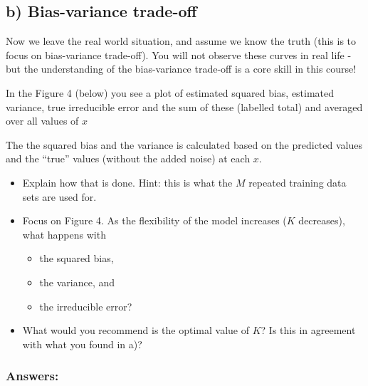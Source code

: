 \documentclass[]{article}
\providecommand{\tightlist}{%
  \setlength{\itemsep}{0pt}\setlength{\parskip}{0pt}}
\begin{document}
\subsection{b) Bias-variance trade-off}\label{b-bias-variance-trade-off}

Now we leave the real world situation, and assume we know the truth
(this is to focus on bias-variance trade-off). You will not observe
these curves in real life - but the understanding of the bias-variance
trade-off is a core skill in this course!

In the Figure 4 (below) you see a plot of estimated squared bias,
estimated variance, true irreducible error and the sum of these
(labelled total) and averaged over all values of \(x\)

The the squared bias and the variance is calculated based on the
predicted values and the ``true'' values (without the added noise) at
each \(x\).

\begin{itemize}
\tightlist
\item
  Explain how that is done. Hint: this is what the \(M\) repeated
  training data sets are used for.
\item
  Focus on Figure 4. As the flexibility of the model increases (\(K\)
  decreases), what happens with

  \begin{itemize}
  \tightlist
  \item
    the squared bias,\\
  \item
    the variance, and\\
  \item
    the irreducible error?
  \end{itemize}
\item
  What would you recommend is the optimal value of \(K\)? Is this in
  agreement with what you found in a)?
\end{itemize}

\subsubsection{Answers:}\label{answers-2}
\end{document}
